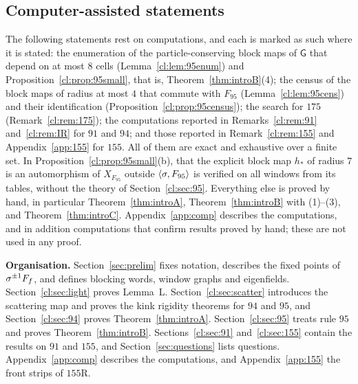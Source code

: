 \subsection{Computer-assisted statements}

The following statements rest on computations, and each is marked as such where it is stated: the enumeration of the particle-conserving block maps of $\mathsf G$ that depend on at most $8$ cells (Lemma~\ref{cl:lem:95enum}) and Proposition~\ref{cl:prop:95small}, that is, Theorem~\ref{thm:introB}(4); the census of the block maps of radius at most $4$ that commute with $F_{95}$ (Lemma~\ref{cl:lem:95cens}) and their identification (Proposition~\ref{cl:prop:95census}); the search for $175$ (Remark~\ref{cl:rem:175}); the computations reported in Remarks~\ref{cl:rem:91} and~\ref{cl:rem:IR} for $91$ and $94$; and those reported in Remark~\ref{cl:rem:155} and Appendix~\ref{app:155} for $155$. All of them are exact and exhaustive over a finite set. In Proposition~\ref{cl:prop:95small}(b), that the explicit block map $h_\ast$ of radius $7$ is an automorphism of $X_{F_{95}}$ outside $\langle\sigma,F_{95}\rangle$ is verified on all windows from its tables, without the theory of Section~\ref{cl:sec:95}. Everything else is proved by hand, in particular Theorem~\ref{thm:introA}, Theorem~\ref{thm:introB} with (1)--(3), and Theorem~\ref{thm:introC}. Appendix~\ref{app:comp} describes the computations, and in addition computations that confirm results proved by hand; these are not used in any proof.

\medskip
\noindent\textbf{Organisation.} Section~\ref{sec:prelim} fixes notation, describes the fixed points of $\sigma^{\pm1}F_f$, and defines blocking words, window graphs and eigenfields. Section~\ref{cl:sec:light} proves Lemma~L. Section~\ref{cl:sec:scatter} introduces the scattering map and proves the kink rigidity theorems for $94$ and $95$, and Section~\ref{cl:sec:94} proves Theorem~\ref{thm:introA}. Section~\ref{cl:sec:95} treats rule $95$ and proves Theorem~\ref{thm:introB}. Sections~\ref{cl:sec:91} and~\ref{cl:sec:155} contain the results on $91$ and $155$, and Section~\ref{sec:questions} lists questions. Appendix~\ref{app:comp} describes the computations, and Appendix~\ref{app:155} the front strips of $155$R.
